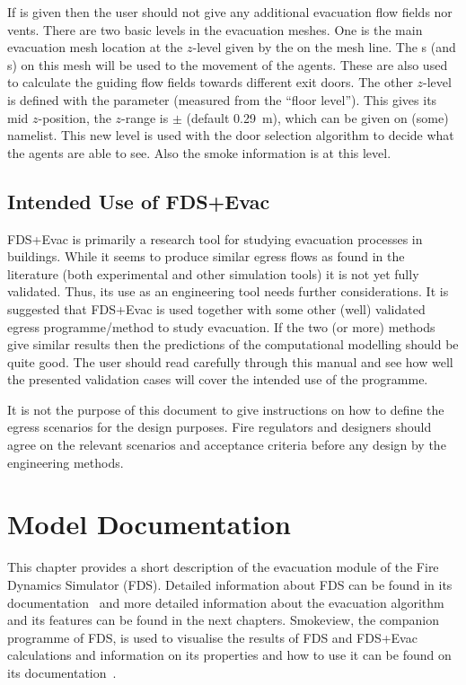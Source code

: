 \documentclass[12pt,a4paper,final,twoside]{stylevk}
\begin{document}
If  is given then the user should not give
any additional evacuation flow fields nor vents.  There are two basic
levels in the evacuation meshes.  One is the main evacuation mesh
location at the $z$-level given by the  on the mesh line.
The s (and s) on this mesh will be used to the
movement of the agents.  These are also used to calculate the guiding
flow fields towards different exit doors.  The other $z$-level is
defined with the  parameter (measured from
the ``floor level'').  This gives its mid $z$-position, the $z$-range
is $\pm$ (default 0.29~m), which can be given
on (some)  namelist.  This new level is used with the door
selection algorithm to decide what the agents are able to see.  Also
the smoke information is at this level.


\section{Intended Use of FDS+Evac}\label{Sec_IntUsers}


\noindent FDS+Evac is primarily a research tool for studying
evacuation processes in buildings.  While it seems to produce similar
egress flows as found in the literature (both experimental and other
simulation tools) it is not yet fully validated.  Thus, its use as an
engineering tool needs further considerations.  It is suggested that
FDS+Evac is used together with some other (well) validated egress
programme/method to study evacuation.  If the two (or more) methods
give similar results then the predictions of the computational
modelling should be quite good.  The user should read carefully
through this manual and see how well the presented validation cases
will cover the intended use of the programme.

It is not the purpose of this document to give instructions on how to
define the egress scenarios for the design purposes.  Fire regulators
and designers should agree on the relevant scenarios and acceptance
criteria before any design by the engineering methods.

\clearpage

\newpage


\chapter{Model Documentation}\label{Sec_ModelDef}

\noindent This chapter provides a short description of the evacuation
module of the Fire Dynamics Simulator (FDS).  Detailed information
about FDS can be found in its documentation~\cite{FDS_Manual,
  FDS_UserGuide, FDS_VVGuide1, FDS_VVGuide2} and more detailed
information about the evacuation algorithm and its features can be
found in the next chapters.  Smokeview, the companion programme of
FDS, is used to visualise the results of FDS and FDS+Evac calculations
and information on its properties and how to use it can be found on
its documentation~\cite{SV_UserGuide, SV_TechGuide, SV_VVGuide}.
\end{document}
